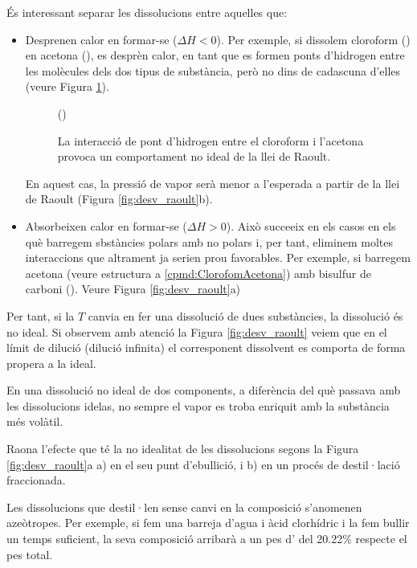 És interessant separar les dissolucions entre aquelles que:
\begin{itemize}
\item Desprenen calor en formar-se ($\Delta H <0$). Per exemple, si dissolem cloroform () en acetona (), es desprèn calor, en tant que es formen ponts d'hidrogen entre les molècules dels dos tipus de substància, però no dins de cadascuna d'elles (veure Figura \ref{fig:CloroformAcetona}).
\begin{figure}
  \centering
{}
()\par
  \caption{La interacció de pont d'hidrogen entre el cloroform i l'acetona provoca un comportament no ideal de la llei de Raoult.}
  \label{fig:CloroformAcetona}
\end{figure}
En aquest cas, la pressió de vapor serà menor a l'esperada a partir de la llei de Raoult (Figura \ref{fig:desv_raoult}b). 
\item Absorbeixen calor en formar-se ($\Delta H > 0$). Això succeeix en els casos en els què barregem sbstàncies polars amb no polars i, per tant, eliminem moltes interaccions que altrament ja serien prou favorables. Per exemple, si barregem acetona (veure estructura a \ref{cpmd:ClorofomAcetona}) amb bisulfur de carboni (). Veure Figura \ref{fig:desv_raoult}a)
\end{itemize} 
Per tant, si la $T$ canvia en fer una dissolució de dues substàncies, la dissolució és no ideal.
Si observem amb atenció la Figura \ref{fig:desv_raoult} veiem que en el límit de dilució (dilució infinita) el corresponent dissolvent es comporta de forma propera a la ideal.

En una dissolució no ideal de dos components, a diferència del què passava amb les dissolucions idelas, no sempre el vapor es troba enriquit amb la substància més volàtil. 

\begin{exr}
Raona l'efecte que té la no idealitat de les dissolucions segons la Figura \ref{fig:desv_raoult}a a) en el seu punt d'ebullició, i b) en un procés de destil·lació fraccionada.
\end{exr}

Les dissolucions que destil·len sense canvi en la composició s'anomenen azeòtropes. Per exemple, si fem una barreja d'agua i àcid clorhídric i la fem bullir un temps suficient, la seva composició arribarà a un pes d' del 20.22\% respecte el pes total.


